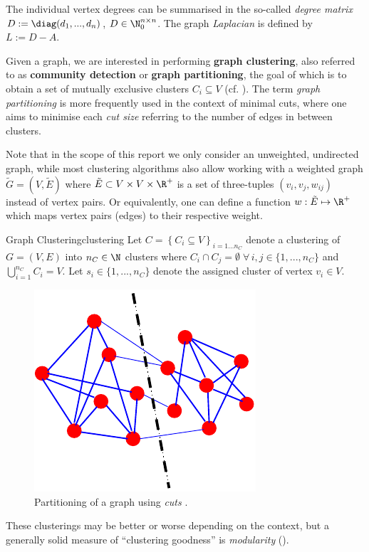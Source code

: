 \documentclass[12pt, a4paper]{article}
\begin{document}
  The individual vertex degrees can be summarised in the so-called \textit{degree matrix} $D := \diag(d_1, ..., d_n)$, $D \in \N_0^{n \times n}$. The graph \textit{Laplacian} is defined by $L := D - A$.

  Given a graph, we are interested in performing \textbf{graph clustering}, also referred to as \textbf{community detection} or \textbf{graph partitioning}, the goal of which is to obtain a set of mutually exclusive clusters $C_i \subseteq V$ (cf. ).
  The term \textit{graph partitioning} is more frequently used in the context of minimal cuts, where one aims to minimise each \textit{cut size} referring to the number of edges in between clusters.

  Note that in the scope of this report we only consider an unweighted, undirected graph, while most clustering algorithms also allow working with a weighted graph $\tilde{G} = (V, \tilde{E})$ where $\tilde{E} \subset V \times V \times \R^+$ is a set of three-tuples $(v_i, v_j, w_{ij})$ instead of vertex pairs. Or equivalently, one can define a function $w: \tilde{E} \mapsto \R^+$ which maps vertex pairs (edges) to their respective weight.

  \begin{definition}{Graph Clustering}{clustering}
    Let $C = \left\{C_i \subseteq V \right\}_{i=1 ... n_C}$ denote a clustering of $G = (V, E)$ into $n_C \in \N$ clusters where $C_i \cap C_j = \emptyset \; \forall\,i, j \in \{1, ..., n_C\}$ and $\bigcup_{i=1}^{n_C} C_i = V$. Let $s_i \in \{1, ..., n_C\}$ denote the assigned cluster of vertex $v_i \in V$.
  \end{definition}

  \begin{figure}[h]
    \centering
    \includegraphics[width=0.3\linewidth]{figures/graphpartitioning.pdf}
    \caption{Partitioning of a graph using \textit{cuts} \parencite{fortunato-2009}.}
  \end{figure}

  These clusterings may be better or worse depending on the context, but a generally solid measure of ``clustering goodness'' is \textit{modularity} ().
\end{document}
